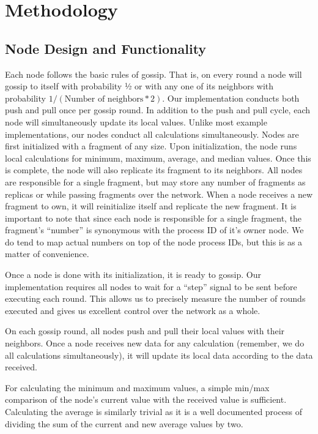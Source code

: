 \section{Methodology}
\subsection{Node Design and Functionality}


Each node follows the basic rules of gossip. That is, on every round a node will gossip to itself with probability ½ or with any one of its neighbors with probability $1/(\textrm{Number of neighbors} * 2)$. Our implementation conducts both push and pull once per gossip round. In addition to the push and pull cycle, each node will simultaneously update its local values. Unlike most example implementations, our nodes conduct all calculations simultaneously.
Nodes are first initialized with a fragment of any size. Upon initialization, the node runs local calculations for minimum, maximum, average, and median values. Once this is complete, the node will also replicate its fragment to its neighbors. All nodes are responsible for a single fragment, but may store any number of fragments as replicas or while passing fragments over the network. When a node receives a new fragment to own, it will reinitialize itself and replicate the new fragment. It is important to note that since each node is responsible for a single fragment, the fragment’s “number” is synonymous with the process ID of it’s owner node. We do tend to map actual numbers on top of the node process IDs, but this is as a matter of convenience.

Once a node is done with its initialization, it is ready to gossip. Our implementation requires all nodes to wait for a “step” signal to be sent before executing each round. This allows us to precisely measure the number of rounds executed and gives us excellent control over the network as a whole.

On each gossip round, all nodes push and pull their local values with their neighbors. Once a node receives new data for any calculation (remember, we do all calculations simultaneously), it will update its local data according to the data received.

For calculating the minimum and maximum values, a simple min/max comparison of the node’s current value with the received value is sufficient. Calculating the average is similarly trivial as it is a well documented process of dividing the sum of the current and new average values by two.

